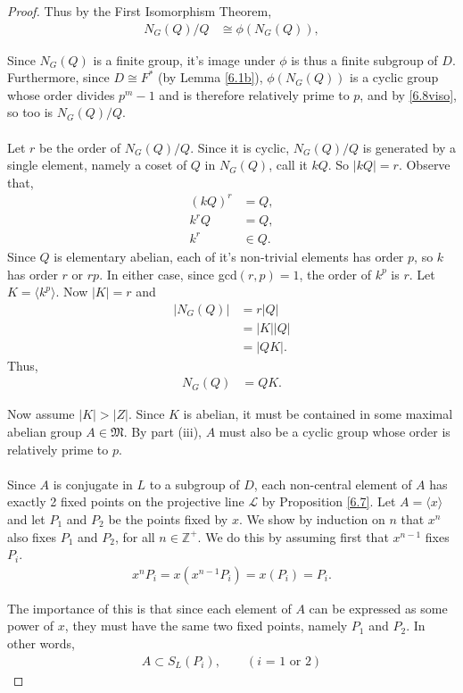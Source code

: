 \begin{proof}
Thus by the First Isomorphism Theorem,
\begin{align}\label{6.8viso} N_G(Q) / Q &\cong \phi(N_G(Q)),
\end{align}

Since $N_G(Q)$ is a finite group, it's image under $\phi$ is thus a finite subgroup of $D$. Furthermore, since $D \cong F^*$ (by Lemma \ref{6.1b}), $\phi(N_G(Q))$ is a cyclic group whose order divides $p^m-1$ and is therefore relatively prime to $p$, and by \eqref{6.8viso}, so too is $N_G(Q) / Q$. \\
\\
Let $r$ be the order of $N_G(Q) / Q$. Since it is cyclic, $N_G(Q)/Q$ is generated by a single element, namely a coset of $Q$ in $N_G(Q)$, call it $kQ$. So $|kQ| = r$. Observe that,
\begin{align*} (kQ)^r &= Q,
\\ k^rQ &= Q,
\\ k^r &\in Q.
\end{align*}
Since $Q$ is elementary abelian, each of it's non-trivial elements has order $p$, so $k$ has order $r$ or $rp$. In either case, since gcd$(r,p)=1$, the order of $k^p$ is $r$. Let $K = \langle k^p \rangle$. Now $|K| = r$ and
\begin{align*} |N_G(Q)| &= r|Q|
\\ &= |K||Q|
\\ &= |QK|. \tag{since $Q \cap K = I_G$} 
\end{align*}
Thus,
\begin{align}\label{QK} N_G(Q) &= QK.
\end{align}

Now assume $|K| > |Z|$. Since $K$ is abelian, it must be contained in some maximal abelian group $A \in \mathfrak{M}$. By part (iii), $A$ must also be a cyclic group whose order is relatively prime to $p$. \\
\\
Since $A$ is conjugate in $L$ to a subgroup of $D$, each non-central element of $A$ has exactly 2 fixed points on the projective line $\mathscr{L}$ by Proposition \ref{6.7}. Let $A = \langle x \rangle$ and let $P_1$ and $P_2$ be the points fixed by $x$. We show by induction on $n$ that $x^n$ also fixes $P_1$ and $P_2$, for all $n \in \mathbb{Z^+}$. We do this by assuming first that $x^{n-1}$ fixes $P_i$.
\begin{align*} x^n P_i = x(x^{n-1} P_i) = x (P_i) = P_i.
\end{align*}

The importance of this is that since each element of $A$ can be expressed as some power of $x$, they must have the same two fixed points, namely $P_1$ and $P_2$. In other words, 
\begin{align}\label{stab} A \subset S_L(P_i), \qquad (\text{$i$ = 1 or 2})
\end{align}


\end{proof}
